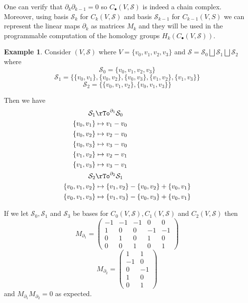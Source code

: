 \documentclass[12pt]{amsart}
\theoremstyle{definition}
\newtheorem{example}[theorem]{Example}
\begin{document}
One can verify that $\partial_k \partial_{k-1} = 0$ so $C_{\bullet}(V, \mathcal{S})$ is indeed a chain complex. Moreover, using basis $\mathcal{S}_k$ for $C_k(V, \mathcal{S})$ and basis $\mathcal{S}_{k-1}$ for $C_{k-1}(V, S)$ we can represent the linear maps $\partial_k$ as matrices $M_k$ and they will be used in the programmable computation of the homology groups $H_k(C_{\bullet}(V, \mathcal{S}))$.

\begin{example} Consider $(V, \mathcal{S})$ where $V = \{v_0, v_1, v_2, v_3\}$ and $\mathcal{S} = \mathcal{S}_0 \bigsqcup \mathcal{S}_1 \bigsqcup \mathcal{S}_2$ where
$$\mathcal{S}_0 = \{v_0, v_1, v_2, v_3\}$$
$$\mathcal{S}_1= \{\{v_0, v_1\}, \{v_0, v_2\}, \{v_0, v_3\}, \{v_1, v_2\}, \{v_1, v_3\}\}$$
$$\mathcal{S}_2 = \{\{v_0, v_1, v_2\}, \{v_0, v_1, v_3\}\}$$

Then we have
\begin{align*}
\mathcal{S}_1 & \rTo^{\partial_1} \mathcal{S}_0 \\
\{v_0, v_1\} & \mapsto v_1 - v_0 \\
\{v_0, v_2\} & \mapsto v_2 - v_0 \\
\{v_0, v_3\} & \mapsto v_3 - v_0 \\
\{v_1, v_2\} & \mapsto v_2 - v_1 \\
\{v_1, v_3\} & \mapsto v_3 - v_1 \\
\mathcal{S}_2 & \rTo^{\partial_2} \mathcal{S}_1 \\
\{v_0, v_1, v_2\} & \mapsto \{v_1, v_2\} - \{v_0, v_2\} + \{v_0, v_1\} \\
\{v_0, v_1, v_3\} & \mapsto \{v_1, v_3\} - \{v_0, v_3\} + \{v_0, v_1\}
\end{align*}

If we let $\mathcal{S}_0, \mathcal{S}_1$ and $\mathcal{S}_3$ be bases for $C_0(V, \mathcal{S}), C_1(V, \mathcal{S})$ and $C_2(V, \mathcal{S})$ then
$$M_{\partial_1} = \left(\begin{array}{ccccc} -1 & -1 & -1 & 0 & 0 \\ 1 & 0 & 0 & -1 & -1 \\ 0 & 1 & 0 & 1 & 0 \\ 0 & 0 & 1 & 0 & 1 \end{array}\right)$$
$$M_{\partial_2} = \left(\begin{array}{cc} 1 & 1 \\ -1 & 0 \\ 0 & -1 \\ 1 & 0 \\ 0 & 1 \end{array}\right)$$
and $M_{\partial_1} M_{\partial_2} = 0$ as expected.
\end{example}
\end{document}
